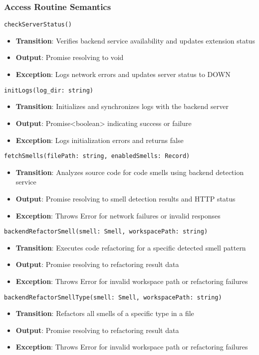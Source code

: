 \documentclass[12pt, titlepage]{article}
\begin{document}
\subsubsection{Access Routine Semantics}

\noindent\texttt{checkServerStatus()}
\begin{itemize}
    \item \textbf{Transition}: Verifies backend service availability and updates extension status
    \item \textbf{Output}: Promise resolving to void
    \item \textbf{Exception}: Logs network errors and updates server status to DOWN
\end{itemize}

\noindent\texttt{initLogs(log\_dir: string)}
\begin{itemize}
    \item \textbf{Transition}: Initializes and synchronizes logs with the backend server
    \item \textbf{Output}: Promise<boolean> indicating success or failure
    \item \textbf{Exception}: Logs initialization errors and returns false
\end{itemize}

\noindent\texttt{fetchSmells(filePath: string, enabledSmells: Record)}
\begin{itemize}
    \item \textbf{Transition}: Analyzes source code for code smells using backend detection service
    \item \textbf{Output}: Promise resolving to smell detection results and HTTP status
    \item \textbf{Exception}: Throws Error for network failures or invalid responses
\end{itemize}

\noindent\texttt{backendRefactorSmell(smell: Smell, workspacePath: string)}
\begin{itemize}
    \item \textbf{Transition}: Executes code refactoring for a specific detected smell pattern
    \item \textbf{Output}: Promise resolving to refactoring result data
    \item \textbf{Exception}: Throws Error for invalid workspace path or refactoring failures
\end{itemize}

\noindent\texttt{backendRefactorSmellType(smell: Smell, workspacePath: string)}
\begin{itemize}
    \item \textbf{Transition}: Refactors all smells of a specific type in a file
    \item \textbf{Output}: Promise resolving to refactoring result data
    \item \textbf{Exception}: Throws Error for invalid workspace path or refactoring failures
\end{itemize}
\end{document}
